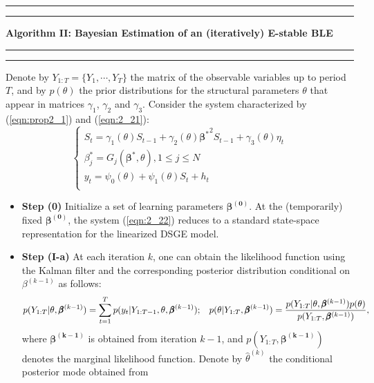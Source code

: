 \begin{table}[!htbp]
\small
\hrule
\hrule
\vspace{2 mm}
{\textbf{Algorithm II: Bayesian Estimation of an (iteratively) E-stable BLE}}\\
\label{algo2}
\hrule
\hrule
\vspace{2 mm}

Denote by $Y_{1:T}=\{Y_1,\cdots,Y_T \}$ the matrix of the observable variables up to period $T$, and by $p(\theta)$ the prior distributions for the structural parameters $\theta$ that appear in matrices $\gamma_1$, $\gamma_2$ and $\gamma_3$. Consider the system characterized by  (\ref{eqn:prop2_1}) and (\ref{eqn:2_21}):
\begin{equation}
\begin{cases}    
S_t = \gamma_1(\theta) S_{t-1}+\gamma_2(\theta) \pmb{ {\beta}^{*}}^2 S_{t-1}+\gamma_3(\theta) \eta_t\\
\beta^{*}_j=G_j(\pmb{ \beta}^{*},\theta), 1 \leq j \leq N\\
y_t = \psi_0(\theta) + \psi_1(\theta) S_t + h_t \\
\label{eqn:2_22}
\end{cases}
\end{equation}
\begin{itemize}
\item \textbf{Step (0)} Initialize a set of learning parameters $\pmb{ \beta^{(0)}}$. At the (temporarily) fixed $\pmb{ \beta^{(0)}}$, the system (\ref{eqn:2_22}) reduces to a standard state-space representation for the linearized DSGE model. 

\item \textbf{Step (I-a)} At each iteration $k$, one can obtain the likelihood function using the Kalman filter and the corresponding posterior distribution conditional on $\beta^{(k-1)}$ as follows:
\begin{equation}
p(Y_{1:T}|\theta,\pmb{\beta}^{(k-1)}) = \sum_{t=1}^{T} p(y_t | Y_{1:T-1},\theta, \pmb{\beta}^{(k-1)}); \hspace{3 mm} p(\theta|Y_{1:T},\pmb{\beta}^{(k-1)}) = \frac{p(Y_{1:T}|\theta,\pmb{ \beta}^{(k-1)})p(\theta)}{p(Y_{1:T},\pmb{\beta}^{(k-1)})},  \label{eqn:2_23}
\end{equation}
where $\pmb{\beta^{(k-1)}}$ is obtained from iteration $k-1$, and $p(Y_{1:T},\pmb{ \beta^{(k-1)}})$ denotes the marginal likelihood function. Denote by $\hat{\theta}^{(k)}$ the conditional posterior mode obtained from 




\end{itemize}
\end{table}

